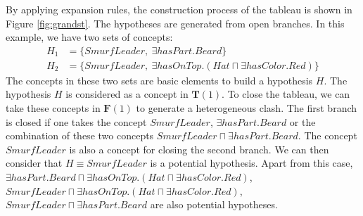 \documentclass{article}
\begin{document}
By applying expansion rules, the construction process of the tableau is shown in Figure \ref{fig:grandst}. The hypotheses are generated from open branches.
In this example, we have two sets of concepts:
\begin{align*}
H_1&=\{SmurfLeader,~\exists hasPart.Beard\}\\
H_2&=\{SmurfLeader,~\exists hasOnTop.(Hat \sqcap  \exists hasColor.Red)\}
\end{align*}
The concepts in these two sets are basic elements to build a hypothesis $H$. The hypothesis $H$ is considered as a concept in $\mathbf{T}(1)$.
To close the tableau, we can take these concepts in $\mathbf{F}(1)$ to generate a heterogeneous clash.
The first branch is closed if one takes the concept $SmurfLeader$, $\exists hasPart.Beard$ or the combination of these two concepts
$SmurfLeader \sqcap \exists hasPart.Beard$. The concept $SmurfLeader$ is also a concept for closing the second branch. We can then consider that $H\equiv SmurfLeader$
is a potential hypothesis. Apart from this case, $\exists hasPart. Beard \sqcap \exists hasOnTop.(Hat \sqcap \exists hasColor.Red)$,
$SmurfLeader \sqcap \exists hasOnTop.(Hat \sqcap \exists hasColor.Red)$, $SmurfLeader \sqcap \exists hasPart.Beard$ are also potential hypotheses.
% 


\end{document}
